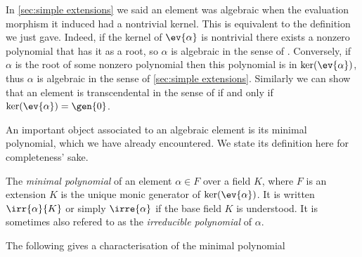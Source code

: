 \documentclass[12pt,oneside]{book}
\begin{document}
In \cref{sec:simple extensions} we said an element was algebraic when the evaluation
morphism it induced had a nontrivial kernel. This is equivalent to the definition we just
gave. Indeed, if the kernel of \( \ev{\alpha} \) is nontrivial there exists a nonzero
polynomial that has it as a root, so \( \alpha \) is algebraic in the sense of
. Conversely, if \( \alpha \) is the 
root of some nonzero polynomial then this polynomial is in \( \ker(\ev{\alpha}) \), thus
\( \alpha \) is algebraic in the sense of \cref{sec:simple extensions}. Similarly we can
show that an element is transcendental in the sense of  if and only if \( \ker(\ev{\alpha}) = \gen{0} \).

An important object associated to an algebraic element is its minimal polynomial, which we
have already encountered. We state its definition here for completeness' sake. 
\begin{definition}
	The \emph{minimal polynomial} of an element \( \alpha \in F \) over a field \( K \),
	where \( F \) is an extension \( K \) is the unique monic generator of \(
	\ker(\ev{\alpha}) \). It is written \( \irr{\alpha}{K} \) or simply \( \irre{\alpha} \)
	if the base field \( K \) is understood. It is sometimes also refered to as the
	\emph{irreducible polynomial} of \( \alpha \).
\end{definition}
The following gives a characterisation of the minimal polynomial
\end{document}
